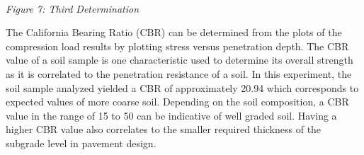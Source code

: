 \documentclass{article}
\begin{document}
\begin{center}
    \vspace{3mm}
    \emph{\\Figure 7: Third Determination}
\end{center}
\par The California Bearing Ratio (CBR) can be determined from the plots of the compression load results by plotting stress versus penetration depth. The CBR value of a soil sample is one characteristic used to determine its overall strength as it is correlated to the penetration resistance of a soil. In this experiment, the soil sample analyzed yielded a CBR of approximately 20.94 which corresponds to expected values of more coarse soil. Depending on the soil composition, a CBR value in the range of 15 to 50 can be indicative of well graded soil. Having a higher CBR value also correlates to the smaller required thickness of the subgrade level in pavement design. 
\end{document}
